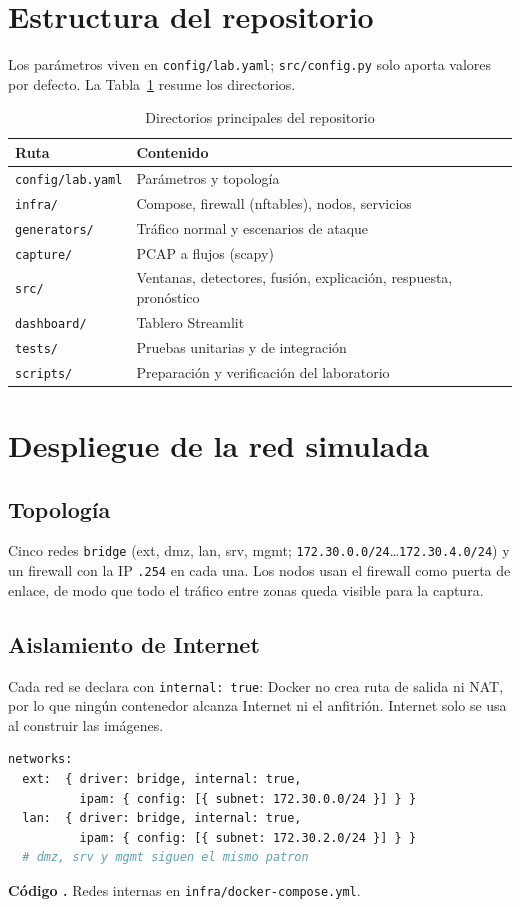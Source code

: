 \documentclass[conference,onecolumn]{IEEEtran}
\newcommand{\cmd}[1]{\texttt{#1}}
\newcounter{codigo}
\newcommand{\codigo}[2]{\par\refstepcounter{codigo}\label{#2}{\footnotesize\textbf{Código \thecodigo.} #1}\par\nopagebreak}
\begin{document}
\section{Estructura del repositorio}
Los parámetros viven en \cmd{config/lab.yaml}; \cmd{src/config.py} solo aporta valores por defecto. La Tabla~\ref{tab:repo} resume los directorios.

\begin{table}[htbp]
\centering
\caption{Directorios principales del repositorio}
\label{tab:repo}
\footnotesize
\begin{tabular}{@{}lp{5.2cm}@{}}
\toprule
Ruta & Contenido \\
\midrule
\cmd{config/lab.yaml} & Parámetros y topología \\
\cmd{infra/} & Compose, firewall (nftables), nodos, servicios \\
\cmd{generators/} & Tráfico normal y escenarios de ataque \\
\cmd{capture/} & PCAP a flujos (scapy) \\
\cmd{src/} & Ventanas, detectores, fusión, explicación, respuesta, pronóstico \\
\cmd{dashboard/} & Tablero Streamlit \\
\cmd{tests/} & Pruebas unitarias y de integración \\
\cmd{scripts/} & Preparación y verificación del laboratorio \\
\bottomrule
\end{tabular}
\end{table}

\section{Despliegue de la red simulada}
\subsection{Topología}
Cinco redes \cmd{bridge} (ext, dmz, lan, srv, mgmt; \cmd{172.30.0.0/24}\ldots\cmd{172.30.4.0/24}) y un firewall con la IP \cmd{.254} en cada una. Los nodos usan el firewall como puerta de enlace, de modo que todo el tráfico entre zonas queda visible para la captura.

\subsection{Aislamiento de Internet}
Cada red se declara con \cmd{internal: true}: Docker no crea ruta de salida ni NAT, por lo que ningún contenedor alcanza Internet ni el anfitrión. Internet solo se usa al construir las imágenes.
\begin{lstlisting}[language=bash]
networks:
  ext:  { driver: bridge, internal: true,
          ipam: { config: [{ subnet: 172.30.0.0/24 }] } }
  lan:  { driver: bridge, internal: true,
          ipam: { config: [{ subnet: 172.30.2.0/24 }] } }
  # dmz, srv y mgmt siguen el mismo patron
\end{lstlisting}
\codigo{Redes internas en \cmd{infra/docker-compose.yml}.}{cod:compose}
\end{document}
